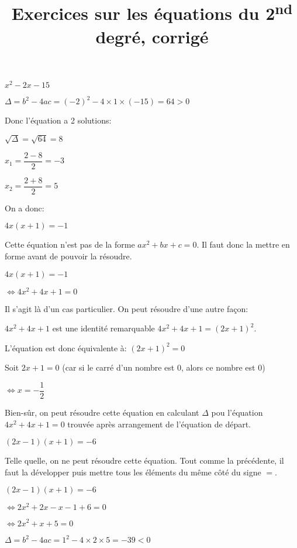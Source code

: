 \documentclass[a4paper,12pt]{scrartcl}
\date{}
\title{Exercices sur les équations du 2\textsuperscript{nd} degré, corrigé}
\author{}
\begin{document}

\maketitle


\question{}
$x^2 - 2x - 15$

$\Delta = b^2 - 4ac = (-2)^2 - 4 \times 1 \times (-15) = 64 > 0$

Donc l'équation a 2 solutions: 

$\sqrt{\Delta} = \sqrt{64} = 8$

$x_1 = \dfrac{2-8}{2} = -3$

$x_2 = \dfrac{2+8}{2} = 5$

On a donc: 


\question{}
$4x(x+1) = -1$

Cette équation n'est pas de la forme $ax^2 + bx + c = 0$. Il faut donc la mettre en forme avant de pouvoir la résoudre.

$4x(x+1) = -1$

$\Leftrightarrow 4x^2 + 4x + 1 = 0$

Il s'agit là d'un cas particulier. On peut résoudre d'une autre façon: 

$4x^2 + 4x + 1$ est une identité remarquable $4x^2 + 4x + 1 = (2x+1)^2$.

L'équation est donc équivalente à: $(2x+1)^2 = 0$

Soit $2x+1 = 0$ (car si le carré d'un nombre est 0, alors ce nombre est 0)

$\Leftrightarrow x = -\dfrac{1}{2}$


Bien-sûr, on peut résoudre cette équation en calculant $\Delta$ pou l'équation $4x^2 + 4x + 1 = 0$ trouvée après arrangement de l'équation de départ.


\question{}
$(2x-1)(x+1) = -6$

Telle quelle, on ne peut résoudre cette équation. Tout comme la précédente, il faut la développer puis mettre tous les éléments du même côté du signe $=$. 

$(2x-1)(x+1) = -6$

$\Leftrightarrow 2x^2 + 2x - x -1 +6 = 0$

$\Leftrightarrow 2x^2 + x +5 = 0$

$\Delta = b^2 - 4ac = 1^2 - 4 \times 2 \times 5 = -39 < 0$
\end{document}
